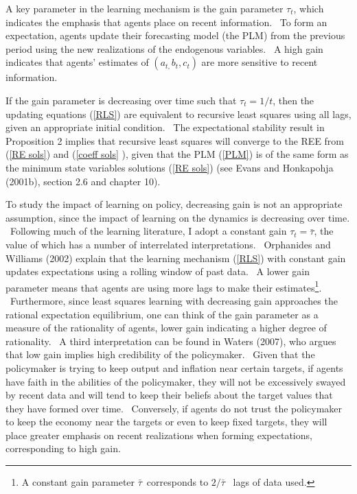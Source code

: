 \documentclass{article}
\begin{document}
\begin{doublespace}
A key parameter in the learning mechanism is the gain parameter $\tau _{t}$,
which indicates the emphasis that agents place on recent information. \ To
form an expectation, agents update their forecasting model (the PLM) from
the previous period using the new realizations of the endogenous variables.
\ A high gain indicates that agents' estimates of $\left(
a_{t,}b_{t},c_{t}\right) $ are more sensitive to recent information.

If the gain parameter is decreasing over time such that $\tau _{t}=1/t$,
then the updating equations (\ref{RLS}) are equivalent to recursive least
squares using all lags, given an appropriate initial condition. \ The
expectational stability result in Proposition 2 implies that recursive least
squares will converge to the REE from (\ref{RE sols}) and (\ref{coeff sols}%
), given that the PLM (\ref{PLM}) is of the same form as the minimum state
variables solutions (\ref{RE sols}) (see Evans and Honkapohja (2001b),
section 2.6 and chapter 10).

To study the impact of learning on policy, decreasing gain is not an
appropriate assumption, since the impact of learning on the dynamics is
decreasing over time. \ Following much of the learning literature, I adopt a
constant gain $\tau _{t}=\bar{\tau}$, the value of which has a number of
interrelated interpretations. \ Orphanides and Williams (2002) explain that
the learning mechanism (\ref{RLS}) with constant gain updates expectations
using a rolling window of past data. \ A lower gain parameter means that
agents are using more lags to make their estimates\footnote{%
A constant gain parameter $\bar{\tau}$\ corresponds to $2/\bar{\tau}$ \ lags
of data used.}. \ Furthermore, since least squares learning with decreasing
gain approaches the rational expectation equilibrium, one can think of the
gain parameter as a measure of the rationality of agents, lower gain
indicating a higher degree of rationality. \ A third interpretation can be
found in Waters (2007), who argues that low gain implies high credibility of
the policymaker. \ Given that the policymaker is trying to keep output and
inflation near certain targets, if agents have faith in the abilities of the
policymaker, they will not be excessively swayed by recent data and will
tend to keep their beliefs about the target values that they have formed
over time. \ Conversely, if agents do not trust the policymaker to keep the
economy near the targets or even to keep fixed targets, they will place
greater emphasis on recent realizations when forming expectations,
corresponding to high gain.


\end{doublespace}
\end{document}
